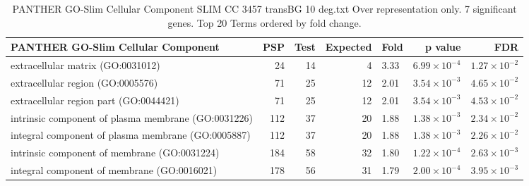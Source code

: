 \begin{table}[ht]
\centering
\begin{adjustbox}{width=\textwidth}
\begin{tabular}{lrrrlrr}
  \hline
PANTHER GO-Slim Cellular Component & PSP  & Test  & Expected & Fold & p value & FDR \\ 
  \hline
extracellular matrix (GO:0031012) & 24 & 14 & 4 & 3.33 & $6.99 \times 10^{-4}$ & $1.27 \times 10^{-2}$ \\ 
  extracellular region (GO:0005576) & 71 & 25 & 12 & 2.01 & $3.54 \times 10^{-3}$ & $4.65 \times 10^{-2}$ \\ 
  extracellular region part (GO:0044421) & 71 & 25 & 12 & 2.01 & $3.54 \times 10^{-3}$ & $4.53 \times 10^{-2}$ \\ 
  intrinsic component of plasma membrane (GO:0031226) & 112 & 37 & 20 & 1.88 & $1.38 \times 10^{-3}$ & $2.34 \times 10^{-2}$ \\ 
  integral component of plasma membrane (GO:0005887) & 112 & 37 & 20 & 1.88 & $1.38 \times 10^{-3}$ & $2.26 \times 10^{-2}$ \\ 
  intrinsic component of membrane (GO:0031224) & 184 & 58 & 32 & 1.80 & $1.22 \times 10^{-4}$ & $2.63 \times 10^{-3}$ \\ 
  integral component of membrane (GO:0016021) & 178 & 56 & 31 & 1.79 & $2.00 \times 10^{-4}$ & $3.95 \times 10^{-3}$ \\ 
   \hline
\end{tabular}
\end{adjustbox}
\caption{PANTHER GO-Slim Cellular Component SLIM CC 3457 transBG 10 deg.txt Over representation only. 7 significant genes. Top 20 Terms ordered by fold change. } 
\label{tab:PANTHER GO-Slim Cellular Component SLIM CC 3457 transBG 10 deg.txt Over representation only. 7 significant genes. Top 20 Terms ordered by fold change. }
\end{table}








